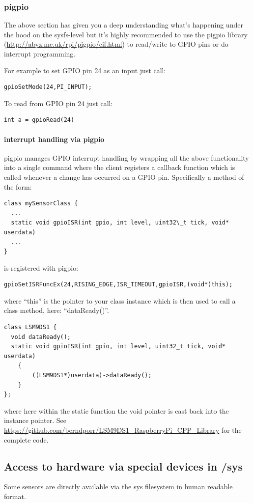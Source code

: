 \documentclass[12pt]{report}
\begin{document}
\subsubsection{pigpio}
The above section has given you a deep understanding what's happening
under the hood on the sysfs-level but it's highly recommended to
use the pigpio library (\url{http://abyz.me.uk/rpi/pigpio/cif.html})
to read/write to GPIO pins or do interrupt programming.

For example to set GPIO pin 24 as an input just call:
\begin{verbatim}
gpioSetMode(24,PI_INPUT);
\end{verbatim}

To read from GPIO pin 24 just call:
\begin{verbatim}
int a = gpioRead(24)
\end{verbatim}

\paragraph{interrupt handling via pigpio}
pigpio manages GPIO interrupt handling by wrapping all the above
functionality into a single command where the client registers a
callback function which is called whenever a change has occurred on a
GPIO pin.
Specifically a method of the form:
\begin{verbatim}
class mySensorClass {
  ...
  static void gpioISR(int gpio, int level, uint32\_t tick, void* userdata)
  ...
}
\end{verbatim}
is registered with pigpio:
\begin{verbatim}
gpioSetISRFuncEx(24,RISING_EDGE,ISR_TIMEOUT,gpioISR,(void*)this);
\end{verbatim}
where ``this'' is the pointer to your class instance which is then used
to call a class method, here: ``dataReady()''.
\begin{verbatim}
class LSM9DS1 {
  void dataReady();
  static void gpioISR(int gpio, int level, uint32_t tick, void* userdata)
    {
        ((LSM9DS1*)userdata)->dataReady();
    }
};
\end{verbatim}
where here within the static function the void pointer is cast back into the instance pointer.
See \url{https://github.com/berndporr/LSM9DS1_RaspberryPi_CPP_Library} for the complete code.



\subsection{Access to hardware via special devices in /sys}
Some sensors are directly available via the sys filesystem in human readable format.
\end{document}
